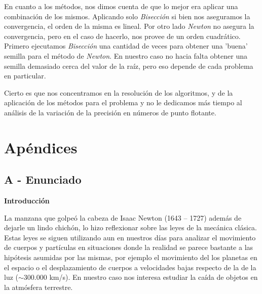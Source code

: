 \documentclass[a4paper]{article}
\begin{document}
En cuanto a los métodos, nos dimos cuenta de que lo mejor era aplicar una combinación de los mismos. Aplicando solo \textit{Bisección} si bien nos aseguramos la convergencia, el orden de la misma es lineal. Por otro lado \textit{Newton} no asegura la convergencia, pero en el caso de hacerlo, nos provee de un orden cuadrático. 
Primero ejecutamos \textit{Bisección} una cantidad de veces para obtener una 'buena' semilla para el método de \textit{Newton}. En nuestro caso no hacia falta obtener una semilla demasiado cerca del valor de la raíz, pero eso depende de cada problema en particular. 

Cierto es que nos concentramos en la resolución de los algoritmos, y de la aplicación de los métodos para el problema y no le dedicamos más tiempo al análisis de la variación de la precisión en números de punto flotante.

\newpage

\section{Apéndices}
\subsection{A - Enunciado}
{\bf Introducción}

La manzana que golpeó la cabeza de Isaac Newton (1643 -- 1727) además de dejarle un lindo chichón, lo hizo reflexionar sobre las leyes de la mecánica clásica. Estas leyes se siguen utilizando aun en nuestros días para analizar el movimiento de cuerpos y partículas en situaciones donde la realidad se parece bastante a las hipótesis asumidas por las mismas, por ejemplo el movimiento del los planetas en el espacio o el desplazamiento de cuerpos a velocidades bajas respecto de la de la luz ($\sim 300.000$ km/s). En nuestro caso nos interesa estudiar la caída de objetos en la atmósfera terrestre.
\end{document}
